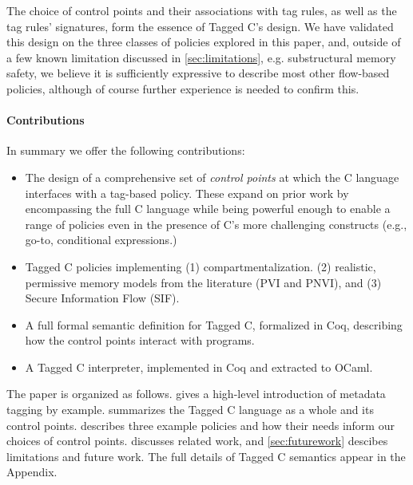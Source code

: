 \documentclass{llncs}
\begin{document}
The choice of control points and their associations with tag rules, as well as the tag rules'
signatures, form the essence of Tagged C's design. 
We have validated this design on the three classes of policies explored in this paper,
and, outside of a few known limitation discussed in \cref{sec:limitations}, e.g. substructural memory safety,
we believe it is sufficiently expressive to describe most other flow-based policies, although
of course further experience is needed to confirm this.

\paragraph*{Contributions}

In summary we offer the following contributions:

\begin{itemize}
\item The design of a comprehensive set of {\em control points} at which the C language interfaces
  with a tag-based policy. These expand on prior work by encompassing the full C language
  while being powerful enough to enable a range of policies even in the presence of C's more challenging
  constructs (e.g., go-to, conditional expressions.)
\item Tagged C policies implementing (1) compartmentalization.
  (2) realistic, permissive memory models from the literature (PVI and PNVI),
  and (3) Secure Information Flow (SIF).
\item A full formal semantic definition for Tagged C, formalized in Coq, describing how the control points
  interact with programs.
\item A Tagged C interpreter, implemented in Coq and extracted to OCaml. 
\end{itemize}

The paper is organized as follows.
 gives a high-level introduction of metadata tagging by example.
 summarizes the Tagged C language as a whole and its control points.
 describes three example policies and how their
needs inform our choices of control points. 
 discusses related work, and \cref{sec:futurework} descibes limitations and future work.
The full details of Tagged C semantics appear in the Appendix.
\end{document}
